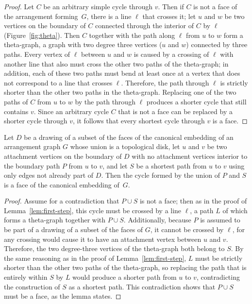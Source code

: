 \documentclass[oribibl]{llncs}
\begin{document}
\begin{proof}
Let $C$ be an arbitrary simple cycle through $v$. Then if $C$ is not a face of the arrangement forming~$G$, there is a line $\ell$ that crosses it; let $u$ and $w$ be two vertices on the boundary of $C$ connected through the interior of $C$ by $\ell$ (Figure~\ref{fig:theta}). Then $C$ together with the path along $\ell$ from $u$ to $w$ form a theta-graph, a graph with two degree three vertices ($u$ and $w$) connected by three paths.  Every vertex of $\ell$ between $u$ and $w$ is caused by a crossing of $\ell$ with another line that also must cross the other two paths of the theta-graph; in addition, each of these two paths must bend at least once at a vertex that does not correspond to a line that crosses $\ell$.
Therefore, the path through $\ell$ is strictly shorter than the other two paths in the theta-graph. Replacing one of the two paths of $C$ from $u$ to $w$ by the path through $\ell$ produces a shorter cycle that still contains $v$. Since an arbitrary cycle $C$ that is not a face can be replaced by a shorter cycle through $v$, it follows that every shortest cycle through $v$ is a face.
\end{proof}

\begin{lemma}
\label{lem:ear}
Let $D$ be a drawing of a subset of the faces of the canonical embedding of an arrangement graph $G$ whose union is a topological disk, let $u$ and $v$ be two attachment vertices on the boundary of $D$ with no attachment vertices interior to the boundary path $P$ from $u$ to $v$, and let $S$ be a shortest path from $u$ to $v$ using only edges not already part of $D$. Then the cycle formed by the union of $P$ and $S$ is a face of the canonical embedding of~$G$.
\end{lemma}

\begin{proof}
Assume for a contradiction that $P\cup S$ is not a face; then as in the proof of Lemma~\ref{lem:first-step}, this cycle must be crossed by a line $\ell$, a path $L$ of which forms a theta-graph together with $P\cup S$. Additionally, because $P$ is assumed to be part of a drawing of a subset of the faces of $G$, it cannot be crossed by $\ell$, for any crossing would cause it to have an attachment vertex between $u$ and $v$. Therefore, the two degree-three vertices of the theta-graph both belong to $S$. By the same reasoning as in the proof of Lemma~\ref{lem:first-step}, $L$ must be strictly shorter than the other two paths of the theta-graph, so replacing the path that is entirely within $S$ by $L$ would produce a shorter path from $u$ to $v$, contradicting the construction of $S$ as a shortest path. This contradiction shows that $P\cup S$ must be a face, as the lemma states.
\end{proof}
\end{document}
